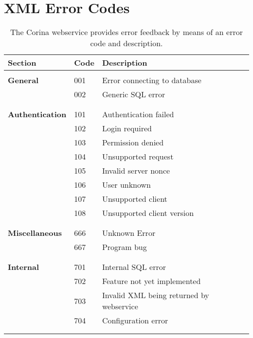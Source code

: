 \chapter{XML Error Codes}

\begin{longtable}{lll}
  \caption{The Corina webservice provides error feedback by means of an error code and description.}\\
  \toprule
  \textbf{Section} & \textbf{Code} & \textbf{Description} \\
  \endhead
  \midrule
  & & \\

  \textbf{General}
  & 001 & Error connecting to database \\
  & 002 & Generic SQL error \\
  
  & & \\
  \midrule
  & & \\
  
  \textbf{Authentication}
  & 101 & Authentication failed \\
  & 102 & Login required \\
  & 103 & Permission denied \\
  & 104 & Unsupported request \\
  & 105 & Invalid server nonce \\
  & 106 & User unknown \\
  & 107 & Unsupported client \\
  & 108 & Unsupported client version \\

  & & \\
  \midrule
  & & \\

  \textbf{Miscellaneous} 
  & 666 & Unknown Error \\
  & 667 & Program bug \\

  & & \\
  \midrule
  & & \\

  \textbf{Internal} 
  & 701 & Internal SQL error \\
  & 702 & Feature not yet implemented \\
  & 703 & Invalid XML being returned by webservice \\
  & 704 & Configuration error \\

  & & \\
  \midrule
  & & \\


\end{longtable}
